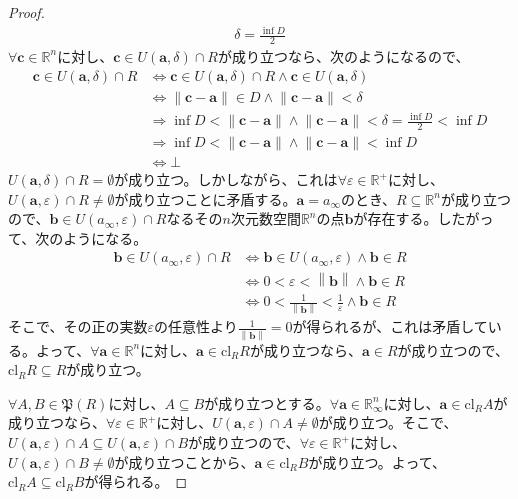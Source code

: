 \documentclass[dvipdfmx]{jsarticle}
\begin{document}
\begin{proof}
\begin{align*}
\delta = \frac{\inf D}{2}
\end{align*}
$\forall\mathbf{c} \in \mathbb{R}^{n}$に対し、$\mathbf{c} \in U\left( \mathbf{a},\delta \right) \cap R$が成り立つなら、次のようになるので、
\begin{align*}
\mathbf{c} \in U\left( \mathbf{a},\delta \right) \cap R &\Leftrightarrow \mathbf{c} \in U\left( \mathbf{a},\delta \right) \cap R \land \mathbf{c} \in U\left( \mathbf{a},\delta \right)\\
&\Leftrightarrow \left\| \mathbf{c} - \mathbf{a} \right\| \in D \land \left\| \mathbf{c} - \mathbf{a} \right\| < \delta\\
&\Rightarrow \inf D < \left\| \mathbf{c} - \mathbf{a} \right\| \land \left\| \mathbf{c} - \mathbf{a} \right\| < \delta = \frac{\inf D}{2} < \inf D\\
&\Rightarrow \inf D < \left\| \mathbf{c} - \mathbf{a} \right\| \land \left\| \mathbf{c} - \mathbf{a} \right\| < \inf D\\
&\Leftrightarrow \bot
\end{align*}
$U\left( \mathbf{a},\delta \right) \cap R = \emptyset$が成り立つ。しかしながら、これは$\forall\varepsilon \in \mathbb{R}^{+}$に対し、$U\left( \mathbf{a},\varepsilon \right) \cap R \neq \emptyset$が成り立つことに矛盾する。$\mathbf{a} = a_{\infty}$のとき、$R \subseteq \mathbb{R}^{n}$が成り立つので、$\mathbf{b} \in U\left( a_{\infty},\varepsilon \right) \cap R$なるその$n$次元数空間$\mathbb{R}^{n}$の点$\mathbf{b}$が存在する。したがって、次のようになる。
\begin{align*}
\mathbf{b} \in U\left( a_{\infty},\varepsilon \right) \cap R &\Leftrightarrow \mathbf{b} \in U\left( a_{\infty},\varepsilon \right) \land \mathbf{b} \in R\\
&\Leftrightarrow 0 < \varepsilon < \left\| \mathbf{b} \right\| \land \mathbf{b} \in R\\
&\Leftrightarrow 0 < \frac{1}{\left\| \mathbf{b} \right\|} < \frac{1}{\varepsilon} \land \mathbf{b} \in R
\end{align*}
そこで、その正の実数$\varepsilon$の任意性より$\frac{1}{\left\| \mathbf{b} \right\|} = 0$が得られるが、これは矛盾している。よって、$\forall\mathbf{a} \in \mathbb{R}^{n}$に対し、$\mathbf{a} \in \mathrm{cl}_{R}R$が成り立つなら、$\mathbf{a} \in R$が成り立つので、$\mathrm{cl}_{R}R \subseteq R$が成り立つ。\par
$\forall A,B \in \mathfrak{P}(R)$に対し、$A \subseteq B$が成り立つとする。$\forall\mathbf{a} \in \mathbb{R}_{\infty}^{n}$に対し、$\mathbf{a} \in \mathrm{cl}_{R}A$が成り立つなら、$\forall\varepsilon \in \mathbb{R}^{+}$に対し、$U\left( \mathbf{a},\varepsilon \right) \cap A \neq \emptyset$が成り立つ。そこで、$U\left( \mathbf{a},\varepsilon \right) \cap A \subseteq U\left( \mathbf{a},\varepsilon \right) \cap B$が成り立つので、$\forall\varepsilon \in \mathbb{R}^{+}$に対し、$U\left( \mathbf{a},\varepsilon \right) \cap B \neq \emptyset$が成り立つことから、$\mathbf{a} \in \mathrm{cl}_{R}B$が成り立つ。よって、$\mathrm{cl}_{R}A \subseteq \mathrm{cl}_{R}B$が得られる。\par

\end{proof}
\end{document}
